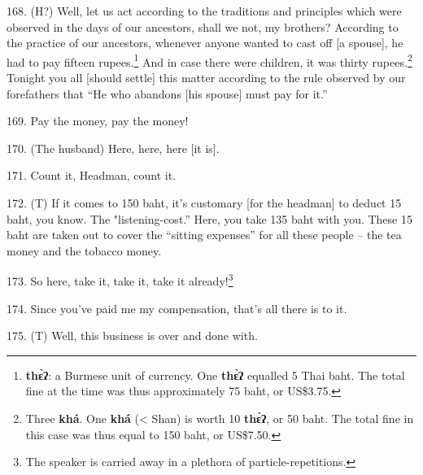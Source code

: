168. (H?) Well, let us act according to the traditions and principles which were
observed in the days of our ancestors, shall we not, my brothers? According to
the practice of our ancestors, whenever anyone wanted to cast off [a spouse], he
had to pay fifteen rupees.\footnote{\textbf{thɛ̀ʔ}: a Burmese unit of currency. One \textbf{thɛ̀ʔ} equalled 5 Thai baht. The total fine at the time was thus approximately 75 baht, or US\$3.75.} And in case there were children, it was thirty rupees.\footnote{Three \textbf{khá}. One \textbf{khá} (< Shan) is worth 10 \textbf{thɛ̀ʔ}, or 50 baht. The total fine in this case was thus equal to 150 baht, or US\$7.50.}
Tonight you all [should settle] this matter according to the rule observed by our
forefathers that ``He who abandons [his spouse] must pay for it.''

169. Pay the money, pay the money!

170. (The husband) Here, here, here [it is].

171. Count it, Headman, count it.

172. (T) If it comes to 150 baht, it's customary [for the headman] to deduct 15
baht, you know. The "listening-cost.'' Here, you take 135 baht with you.
These 15 baht are taken out to cover the ``sitting expenses'' for
all these people -- the tea money and the tobacco money.

173. So here, take it, take it, take it already!\footnote{The speaker is carried away in a plethora of particle-repetitions.}

174.  Since you've paid me my compensation, that's
all there is to it.

175. (T) Well, this business is over and done with.

